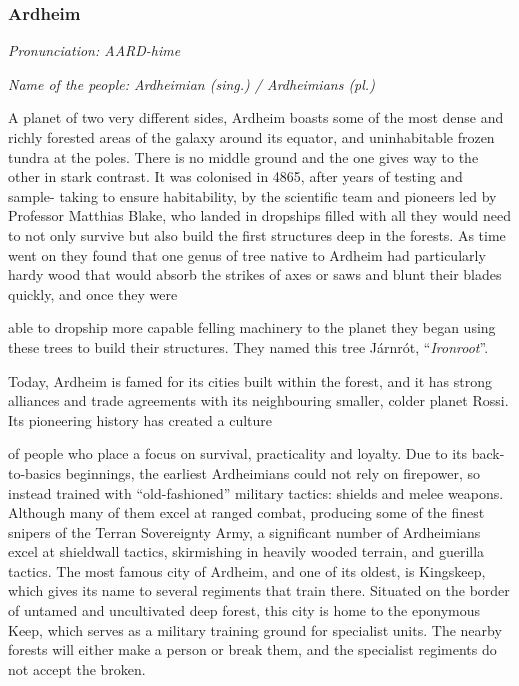 \subsubsection{Ardheim}

\textit{Pronunciation: AARD-hime}

\textit{Name of the people: Ardheimian (sing.) / Ardheimians (pl.)}

A planet of two very different sides, Ardheim boasts some of the most dense and richly forested areas of the galaxy around its equator, and uninhabitable frozen tundra at the poles. There is no middle ground and the one gives way to the other in stark contrast. It was colonised in 4865, after years of testing and sample- taking to ensure habitability, by the scientific team and pioneers led by Professor Matthias Blake, who landed in dropships filled with all they would need to not only survive but also build the first structures deep in the forests. As time went on they found that one genus of tree native to Ardheim had particularly hardy wood that would absorb the strikes of axes or saws and blunt their blades quickly, and once they were

able to dropship more capable felling machinery to the planet they began using these trees to build their structures. They named this tree J\'{a}rnr\'{o}t, ``\textit{Ironroot}''.

Today, Ardheim is famed for its cities built within the forest, and it has strong alliances and trade agreements with its neighbouring smaller, colder planet Rossi. Its pioneering history has created a culture

of people who place a focus on survival, practicality and loyalty. Due to its back-to-basics beginnings, the earliest Ardheimians could not rely on firepower, so instead trained with ``old-fashioned'' military tactics: shields and melee weapons. Although many of them excel at ranged combat, producing some of the finest snipers of the Terran Sovereignty Army, a significant number of Ardheimians excel at shieldwall tactics, skirmishing in heavily wooded terrain, and guerilla tactics. The most famous city of Ardheim, and one of its oldest, is Kingskeep, which gives its name to several regiments that train there. Situated on the border of untamed and uncultivated deep forest, this city is home to the eponymous Keep, which serves as a military training ground for specialist units. The nearby forests will either make a person or break them, and the specialist regiments do not accept the broken.

